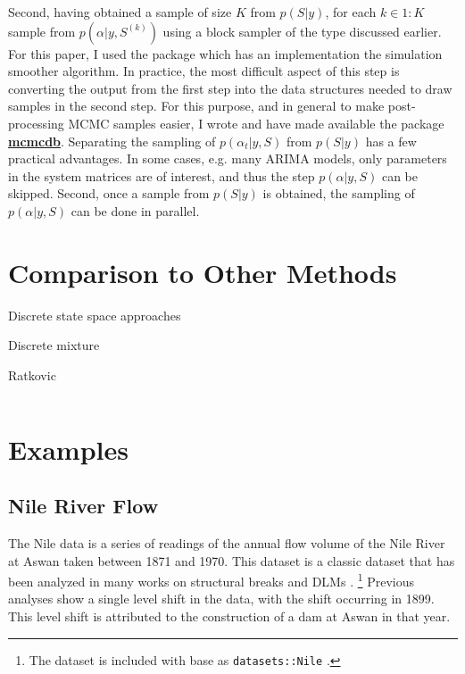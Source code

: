 \documentclass{article}
\begin{document}
Second, having obtained a sample of size $K$ from $p(S | y)$, for each $k \in 1:K$ sample from $p(\alpha | y, S^{(k)})$ using a block sampler of the type discussed earlier.
For this paper, I used the \RLang{} package  \parencite{Helske2012} which has an implementation the \textcite{DurbinKoopman2002} simulation smoother algorithm.
In practice, the most difficult aspect of this step is converting the output from the first step into the data structures needed to draw samples in the second step.
For this purpose, and in general to make post-processing MCMC samples easier, I wrote and have made available the \RLang{} package \href{https://github.com/jrnold/mcmcdb}{\textbf{mcmcdb}}.
Separating the sampling of $p(\alpha_{t} | y, S)$ from $p(S | y)$ has a few practical advantages.
In some cases, e.g. many ARIMA models, only parameters in the system matrices are of interest, and thus the step $p(\alpha | y, S)$ can be skipped.
Second, once a sample from $p(S | y)$ is obtained, the sampling of $p(\alpha | y, S)$ can be done in parallel.

\section{Comparison to Other Methods}
\label{sec:comp-other-meth}

Discrete state space approaches

Discrete mixture

Ratkovic

\begin{equation}
  \label{eq:24}
  
\end{equation}

\section{Examples}
\label{sec:examples}

\subsection{Nile River Flow}
\label{sec:nile}

The Nile data is a series of readings of the annual flow volume of the Nile River at Aswan taken between 1871 and 1970.
This dataset is a classic dataset that has been analyzed in many works on structural breaks and DLMs \parencites{Cobb1978}{Balke1993}{JongPenzer1998}{DurbinKoopman2001}{CommandeurKoopmanOoms2011}.%
\footnote{The dataset is included with base \RLang{} as \texttt{datasets::Nile} \parencite{RCT2013}.}
Previous analyses show a single level shift in the data, with the shift occurring in 1899.
This level shift is attributed to the construction of a dam at Aswan in that year.
\end{document}
